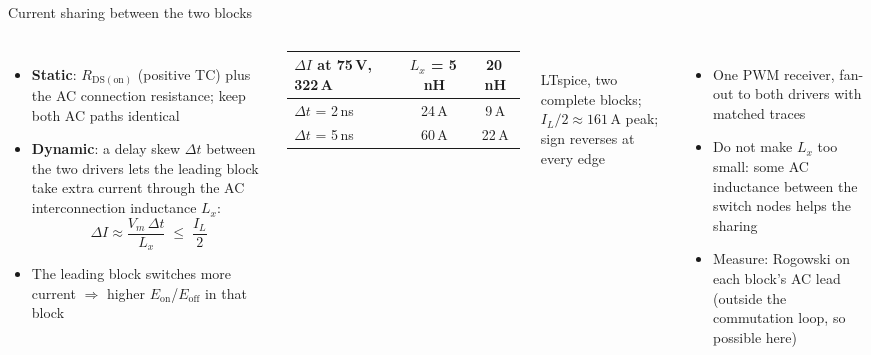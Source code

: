 \documentclass[aspectratio=169,10pt]{beamer}
\begin{document}
\begin{frame}{Current sharing between the two blocks}
\begin{columns}[T]
\small
\begin{itemize}
\item \textbf{Static}: $R_\mathrm{DS(on)}$ (positive TC) plus the AC connection resistance; keep both AC paths identical
\item \textbf{Dynamic}: a delay skew $\Delta t$ between the two drivers lets the leading block take extra current through the AC interconnection inductance $L_x$:
\[ \Delta I \approx \frac{V_m\,\Delta t}{L_x}\;\leq\;\frac{I_L}{2} \]
\item The leading block switches more current $\Rightarrow$ higher $E_\mathrm{on}$/$E_\mathrm{off}$ in that block
\end{itemize}
\small
\begin{tabular}{@{}lcc@{}}
\toprule
$\Delta I$ at 75\,V, 322\,A & $L_x$ = 5\,nH & 20\,nH \\
\midrule
$\Delta t$ = 2\,ns & 24\,A & 9\,A \\
$\Delta t$ = 5\,ns & 60\,A & 22\,A \\
\bottomrule
\end{tabular}\\
{\scriptsize LTspice, two complete blocks; $I_L/2 \approx 161$\,A peak; sign reverses at every edge}
\begin{itemize}
\item One PWM receiver, fan-out to both drivers with matched traces
\item Do not make $L_x$ too small: some AC inductance between the switch nodes helps the sharing
\item Measure: Rogowski on each block's AC lead (outside the commutation loop, so possible here)
\end{itemize}
\end{columns}
\end{frame}

\end{document}
